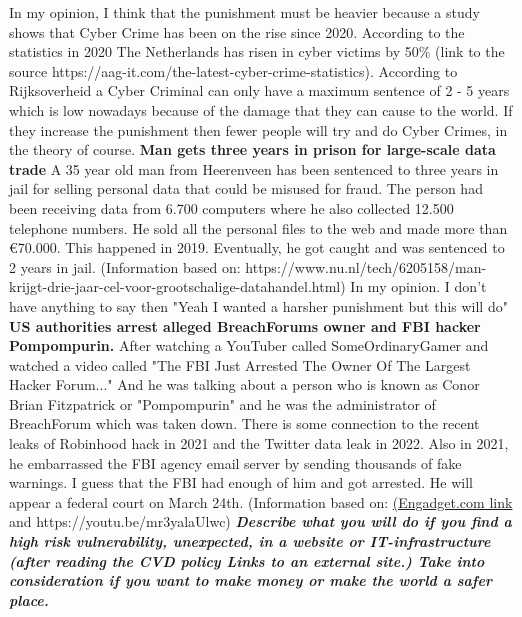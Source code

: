 \documentclass[12pt, letterpaper]{article}
\begin{document}
\hfill\break
\hfill\break
In my opinion, I think that the punishment must be heavier because a study shows that Cyber Crime has been on the rise since 2020. According to the statistics in 2020 The Netherlands has risen in cyber victims by 50\% (link to the source https://aag-it.com/the-latest-cyber-crime-statistics). According to Rijksoverheid a Cyber Criminal can only have a maximum sentence of 2 - 5 years which is low nowadays because of the damage that they can cause to the world. If they increase the punishment then fewer people will try and do Cyber Crimes, in the theory of course.
\hfill\break
\hfill\break
\textbf{Man gets three years in prison for large-scale data trade}
\hfill\break
A 35 year old man from Heerenveen has been sentenced to three years in jail for selling personal data that could be misused for fraud.
The person had been receiving data from 6.700 computers where he also collected 12.500 telephone numbers. He sold all the personal files to the web and made more than €70.000. This happened in 2019. Eventually, he got caught and was sentenced to 2 years in jail. (Information based on: https://www.nu.nl/tech/6205158/man-krijgt-drie-jaar-cel-voor-grootschalige-datahandel.html)
\hfill\break
\hfill\break
In my opinion. I don't have anything to say then "Yeah I wanted a harsher punishment but this will do"
\hfill\break
\hfill\break
\textbf{\textbf{US authorities arrest alleged BreachForums owner and FBI hacker Pompompurin.}}
\hfill\break
After watching a YouTuber called SomeOrdinaryGamer and watched a video called "The FBI Just Arrested The Owner Of The Largest Hacker Forum..." And he was talking about a person who is known as Conor Brian Fitzpatrick or "Pompompurin" and he was the administrator of BreachForum which was taken down. There is some connection to the recent leaks of Robinhood hack in 2021 and the Twitter data leak in 2022. Also in 2021, he embarrassed the FBI agency email server by sending thousands of fake warnings. I guess that the FBI had enough of him and got arrested. He will appear a federal court on March 24th. (Information based on: \href{https://www.engadget.com/us-authorities-arrest-alleged-breachforums-owner-and-fbi-hacker-pompompurin-170009266.html?guccounter=1&guce_referrer=aHR0cHM6Ly9kdWNrZHVja2dvLmNvbS8&guce_referrer_sig=AQAAAEQpBy2kyPUw8ATdF7w0YnJKYmFnjlXQBih0kfhNxBKIz72UCOUpxu9292uBgp_UYr943Ch6jme-7qPjiaPoIvwA0tF3gzqrTQ53lsHHJLU7iIAFF4HlycLB-xIWOjEry79rP-CuyE__yIWz8JT8XhYLqHe6qQjX4liyn7WTZRug}{(Engadget.com link} and https://youtu.be/mr3yalaUlwc)
\hfill\break
\hfill\break
\textbf{\emph {Describe what you will do if you find a high risk vulnerability, unexpected, in a website or IT-infrastructure (after reading the CVD policy Links to an external site.) Take into consideration if you want to make money or make the world a safer place.}}
\end{document}
